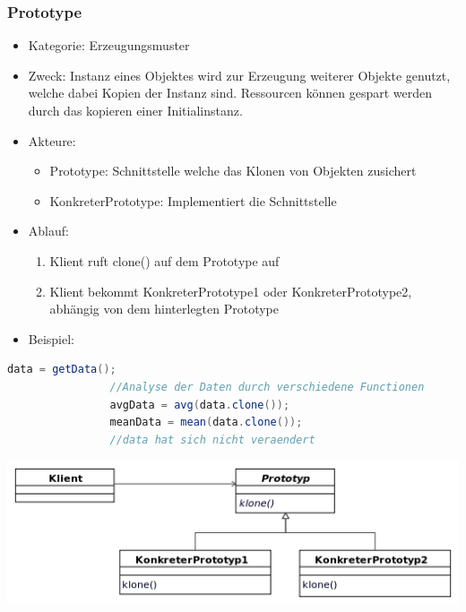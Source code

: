 \documentclass[11pt, fleqn, a4paper, leqno]{scrartcl} %
\begin{document}
		\subsubsection{Prototype}
			\begin{itemize}
				\item Kategorie: Erzeugungsmuster
				\item Zweck: Instanz eines Objektes wird zur Erzeugung weiterer Objekte genutzt, welche dabei Kopien der Instanz sind. Ressourcen können gespart werden durch das kopieren einer Initialinstanz.
				\item Akteure: 
					\begin{itemize}
						\item Prototype: Schnittstelle welche das Klonen von Objekten zusichert
						\item KonkreterPrototype: Implementiert die Schnittstelle
					\end{itemize}
				\item Ablauf:
					\begin{enumerate}
						\item Klient ruft clone() auf dem Prototype auf
						\item Klient bekommt KonkreterPrototype1 oder KonkreterPrototype2, abhängig von dem hinterlegten Prototype
					\end{enumerate}
				\item Beispiel: 
			\end{itemize}
			\begin{lstlisting}[frame=single,language=Java]
				data = getData();
				//Analyse der Daten durch verschiedene Functionen
				avgData = avg(data.clone());
				meanData = mean(data.clone());
				//data hat sich nicht veraendert
			\end{lstlisting}
			\includegraphics[scale=0.6]{images/prototype.png}
		\newpage		
\end{document}
